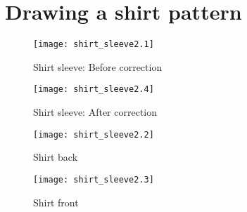 \documentclass{article}
\begin{document}
\section*{Drawing a shirt pattern}

\begin{figure}[htb]
\begin{center}
\texttt{[image: shirt\_sleeve2.1]}
\caption{Shirt sleeve: Before correction}
\end{center}
\end{figure}

\begin{figure}[htb]
\begin{center}
\texttt{[image: shirt\_sleeve2.4]}
\caption{Shirt sleeve: After correction}
\end{center}
\end{figure}

\begin{figure}[htb]
\begin{center}
\texttt{[image: shirt\_sleeve2.2]}
\caption{Shirt back}
\end{center}
\end{figure}

\begin{figure}[htb]
\begin{center}
\texttt{[image: shirt\_sleeve2.3]}
\caption{Shirt front}
\end{center}
\end{figure}
\end{document}
